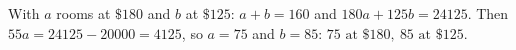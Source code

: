 With $a$ rooms at $\$180$ and $b$ at $\$125$: $a+b=160$ and $180a+125b=24125$. Then $55a=24125-20000=4125$, so $a=75$ and $b=85$: $\boxed{75\text{ at }\$180,\ 85\text{ at }\$125}$.
